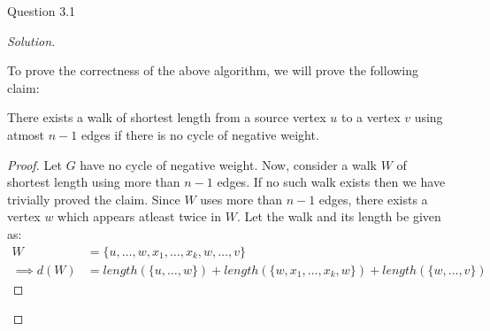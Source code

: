 \begin{solution}{Question 3.1}
\begin{proof}[Solution]
\begin{algorithm}[H]
\begin{algorithmic}[1]
            \end{algorithmic}
        \end{algorithm}
        \begin{algorithm}[H]
            \begin{algorithmic}[1]
                            \EndIf{}
                        \EndFor{}
                    \EndFor{}
                        \EndIf{}
                    \EndFor{}
                \EndProcedure{}
            \end{algorithmic}
        \end{algorithm}
        To prove the correctness of the above algorithm, we will prove the following claim:
        \begin{claim}\label{claim:lessn}
            There exists a walk of shortest length from a source vertex $u$ to a vertex $v$ using atmost $n-1$ edges if there is no cycle of negative weight.
        \end{claim}
        \begin{proof}
            Let $G$ have no cycle of negative weight. Now, consider a walk $W$ of shortest length using more than $n-1$ edges. If no such walk exists then we have trivially proved the claim. Since $W$ uses more than $n-1$ edges, there exists a vertex $w$ which appears atleast twice in $W$. Let the walk and its length be given as:
            \begin{equation}
                \begin{split}
                    W &= \{u, \ldots, w, x_1, \ldots, x_k, w, \ldots, v\}\\
                    \implies d(W) &= length(\{u, \ldots, w\}) + length(\{w, x_1, \ldots, x_k, w\}) + length(\{w, \ldots, v\})
                \end{split}
            \end{equation}

\end{proof}
\end{proof}
\end{solution}
